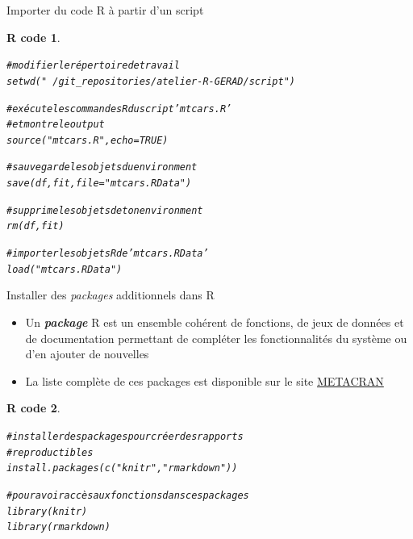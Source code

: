 \documentclass[11pt]{beamer}\usepackage[]{graphicx}\usepackage[]{color}
\makeatletter
\newcommand{\hlnum}[1]{\textcolor[rgb]{0.063,0.58,0.627}{#1}}%
\newcommand{\hlstr}[1]{\textcolor[rgb]{0.063,0.58,0.627}{#1}}%
\newcommand{\hlcom}[1]{\textcolor[rgb]{0.588,0.588,0.588}{#1}}%
\newcommand{\hlstd}[1]{\textcolor[rgb]{0.196,0.196,0.196}{#1}}%
\newcommand{\hlkwc}[1]{\textcolor[rgb]{0,0.631,0.314}{#1}}%
\newcommand{\hlkwd}[1]{\textcolor[rgb]{0.78,0.227,0.412}{#1}}%
\newenvironment{kframe}{%
 \def\at@end@of@kframe{}%
 \ifinner\ifhmode%
  \def\at@end@of@kframe{\end{minipage}}%
  \begin{minipage}{\columnwidth}%
 \fi\fi%
 \def\FrameCommand##1{\hskip\@totalleftmargin \hskip-\fboxsep
 \colorbox{shadecolor}{##1}\hskip-\fboxsep
     \hskip-\linewidth \hskip-\@totalleftmargin \hskip\columnwidth}%
 \MakeFramed {\advance\hsize-\width
   \@totalleftmargin\z@ \linewidth\hsize
   \@setminipage}}%
 {\par\unskip\endMakeFramed%
 \at@end@of@kframe}
\newenvironment{knitrout}{}{} %
\newtheorem{rcode}{R code}[section]
\makeatother
\begin{document}
\begin{frame}[fragile]{Importer du code R à partir d'un script}

\begin{knitrout}\small
{}\color{fgcolor}\begin{kframe}
\begin{rcode}\label{unnamed-chunk-29}\begin{alltt}
\hlcom{# modifier le répertoire de travail}
\hlkwd{setwd}\hlstd{(}\hlstr{"~/git_repositories/atelier-R-GERAD/script"}\hlstd{)}

\hlcom{# exécute les commandes R du script 'mtcars.R'}
\hlcom{# et montre le output}
\hlkwd{source}\hlstd{(}\hlstr{"mtcars.R"}\hlstd{,} \hlkwc{echo} \hlstd{=} \hlnum{TRUE}\hlstd{)}

\hlcom{# sauvegarde les objets du environment}
\hlkwd{save}\hlstd{(df, fit,} \hlkwc{file} \hlstd{=} \hlstr{"mtcars.RData"}\hlstd{)}

\hlcom{# supprime les objets de ton environment}
\hlkwd{rm}\hlstd{(df, fit)}

\hlcom{# importer les objets R de 'mtcars.RData'}
\hlkwd{load}\hlstd{(}\hlstr{"mtcars.RData"}\hlstd{)}
\end{alltt}
\end{rcode}\end{kframe}
\end{knitrout}
\end{frame}




\begin{frame}[fragile]{Installer des \textit{packages} additionnels dans R}

\begin{itemize}
  \setlength\itemsep{1em}
\item Un \textbf{\textit{package}} R est un ensemble cohérent de fonctions, de jeux de données et de documentation permettant de compléter les fonctionnalités du
système ou d'en ajouter de nouvelles
\item La liste complète de ces packages est disponible sur le site \href{http://www.r-pkg.org/}{METACRAN}
\end{itemize}

\begin{knitrout}
\color{fgcolor}\begin{kframe}
\begin{rcode}\label{unnamed-chunk-30}\begin{alltt}
\hlcom{# installer des packages pour créer des rapports}
\hlcom{# reproductibles}
\hlkwd{install.packages}\hlstd{(}\hlkwd{c}\hlstd{(}\hlstr{"knitr"}\hlstd{,}\hlstr{"rmarkdown"}\hlstd{))}

\hlcom{# pour avoir accès aux fonctions dans ces packages}
\hlkwd{library}\hlstd{(knitr)}
\hlkwd{library}\hlstd{(rmarkdown)}
\end{alltt}
\end{rcode}\end{kframe}
\end{knitrout}
\end{frame}
\end{document}
